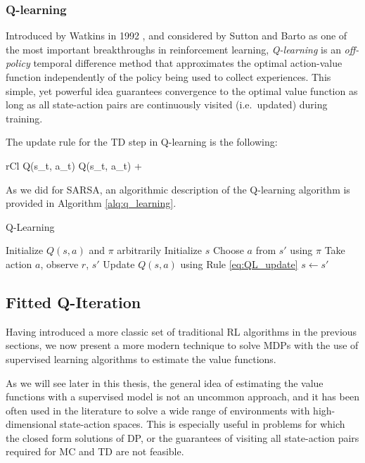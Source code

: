 \subsubsection{Q-learning}
Introduced by Watkins in 1992 \cite{watkins1992q}, and considered by Sutton and 
Barto \cite{sutton1998reinforcement} as one of the most important breakthroughs 
in reinforcement learning, \textit{Q-learning} is an \textit{off-policy} 
temporal difference method that approximates the optimal action-value function 
independently of the policy being used to collect experiences. 
This simple, yet powerful idea guarantees convergence to the optimal 
value function as long as all state-action pairs are continuously visited (i.e.\ 
updated) during training.

The update rule for the TD step in Q-learning is the following: 
%
\begin{IEEEeqnarray}{rCl}
    Q(s_t, a_t) \leftarrow Q(s_t, a_t) +  \label{eq:QL_update}
\end{IEEEeqnarray}
%
As we did for SARSA, an algorithmic description of the Q-learning algorithm is
provided in Algorithm \ref{alq:q_learning}.
%
\begin{algorithm}
    \caption{Q-Learning}
    \label{alq:q_learning}
    \begin{algorithmic}
        \STATE Initialize $Q(s,a)$ and $\pi$ arbitrarily
        \REPEAT
	    \STATE Initialize $s$
	    \REPEAT	
		\STATE Choose $a$ from $s'$ using $\pi$
		\STATE Take action $a$, observe $r$, $s'$
		\STATE Update $Q(s, a)$ using Rule \eqref{eq:QL_update}
		\STATE $s \leftarrow s'$
    \end{algorithmic}
\end{algorithm}
%

\subsection{Fitted Q-Iteration} \label{s:FQI}
Having introduced a more classic set of traditional RL algorithms in the 
previous sections, we now present a more modern technique to solve MDPs with the 
use of supervised learning algorithms to estimate the value functions.

As we will see later in this thesis, the general idea of estimating the value 
functions with a supervised model is not an uncommon approach, and it has been 
often used in the literature to solve a wide range of environments with 
high-dimensional state-action spaces.
This is especially useful in problems for which the closed form solutions of DP,
or the guarantees of visiting all state-action pairs required for MC and TD are 
not feasible.

